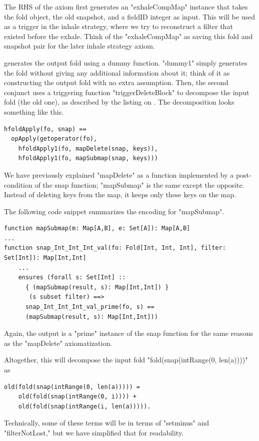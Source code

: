 \documentclass[msc,oneside]{ubcthesis}
\theoremstyle{definition}
\begin{document}
The RHS of the axiom first generates an "exhaleCompMap" instance that takes the fold object, the old snapshot, and a fieldID integer as input. This will be used as a trigger in the inhale strategy, where we try to reconstruct a filter that existed before the exhale. Think of the "exhaleCompMap" as saving this fold and snapshot pair for the later inhale strategy axiom.

generates the output fold using a dummy function. "dummy1" simply generates the fold without giving any additional information about it; think of it as constructing the output fold with no extra assumption.
Then, the second conjunct uses a triggering function "triggerDeleteBlock" to decompose the input fold (the old one), as described by the listing on . The decomposition looks something like this.
\begin{lstlisting}[label=decomsin1,caption=Singleton Decomposition Example]
hfoldApply(fo, snap) == 
  opApply(getoperator(fo), 
    hfoldApply1(fo, mapDelete(snap, keys)), 
    hfoldApply1(fo, mapSubmap(snap, keys)))
\end{lstlisting}
We have previously explained "mapDelete" as a function implemented by a post-condition of the snap function; "mapSubmap" is the same except the opposite. Instead of deleting keys from the map, it keeps only these keys on the map.

The following code snippet summarizes the encoding for "mapSubmap".
\begin{lstlisting}[label=axm:mapSubmap,caption=Encoding of mapSubmap]
function mapSubmap(m: Map[A,B], e: Set[A]): Map[A,B] 
...
function snap_Int_Int_Int_val(fo: Fold[Int, Int, Int], filter: Set[Int]): Map[Int,Int]
    ...
    ensures (forall s: Set[Int] ::
      { (mapSubmap(result, s): Map[Int,Int]) }
       (s subset filter) ==>
      snap_Int_Int_Int_val_prime(fo, s) ==
      (mapSubmap(result, s): Map[Int,Int]))
\end{lstlisting}
Again, the output is a "prime" instance of the snap function for the same reasons as the "mapDelete" axiomatization.

Altogether, this will decompose the input fold "fold(snap(intRange(0, len(a))))" as
\begin{lstlisting}
old(fold(snap(intRange(0, len(a))))) =
    old(fold(snap(intRange(0, i)))) + 
    old(fold(snap(intRange(i, len(a))))).
\end{lstlisting}
Technically, some of these terms will be in terms of "setminus" and "filterNotLost," but we have simplified that for readability. 
\end{document}
